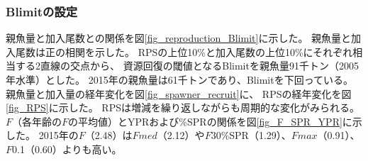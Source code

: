 \subsubsection{Blimitの設定}
親魚量と加入尾数との関係を図\ref{fig_reproduction_Blimit}に示した。
親魚量と加入尾数は正の相関を示した。
RPSの上位10\%と加入尾数の上位10\%にそれぞれ相当する2直線の交点から、
資源回復の閾値となるBlimitを親魚量91千トン（2005年水準）とした。
2015年の親魚量は61千トンであり、Blimitを下回っている。
親魚量と加入量の経年変化を図\ref{fig_spawner_recruit}に、
RPSの経年変化を図\ref{fig_RPS}に示した。
RPSは増減を繰り返しながらも周期的な変化がみられる。
$F$（各年齢の$F$の平均値）とYPRおよび\%SPRの関係を図\ref{fig_F_SPR_YPR}に示した。
2015年の$F$（2.48）は$Fmed$（2.12）や$F$30\%SPR（1.29）、$Fmax$（0.91）、$F$0.1（0.60）よりも高い。

